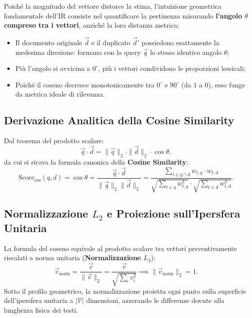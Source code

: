 Poich\'e la magnitudo del vettore distorce la stima, l'intuizione geometrica fondamentale dell'IR consiste nel quantificare la pertinenza misurando \textbf{l'angolo $\theta$ compreso tra i vettori}, anzich\'e la loro distanza metrica:
\begin{itemize}
    \item Il documento originale $\vec{d}$ e il duplicato $\vec{d}'$ possiedono esattamente la medesima direzione: formano con la query $\vec{q}$ lo stesso identico angolo $\theta$;
    \item Pi\`u l'angolo si avvicina a $0^\circ$, pi\`u i vettori condividono le proporzioni lessicali;
    \item Poich\'e il coseno decresce monotonicamente tra $0^\circ$ e $90^\circ$ (da $1$ a $0$), esso funge da metrica ideale di rilevanza.
\end{itemize}

\FloatBarrier
\subsection{Derivazione Analitica della Cosine Similarity}
\label{subsec:derivazione-cosine-similarity}

Dal teorema del prodotto scalare:
\begin{equation}
\vec{q} \cdot \vec{d} = \|\vec{q}\|_2 \cdot \|\vec{d}\|_2 \cdot \cos \theta,
\end{equation}
da cui si ricava la formula canonica della \textbf{Cosine Similarity}:
\begin{equation}
\text{Score}_{\text{cos}}(q, d) = \cos \theta = \frac{\vec{q} \cdot \vec{d}}{\|\vec{q}\|_2 \|\vec{d}\|_2} = \frac{\sum_{t \in q \cap d} w_{t, q} \cdot w_{t, d}}{\sqrt{\sum_{t \in q} w_{t, q}^2} \cdot \sqrt{\sum_{t \in d} w_{t, d}^2}}.
\label{eq:cosine-similarity-def}
\end{equation}

\FloatBarrier
\subsection{Normalizzazione $L_2$ e Proiezione sull'Ipersfera Unitaria}
\label{subsec:normalizzazione-l2-ipersfera}

La formula del coseno equivale al prodotto scalare tra vettori preventivamente riscalati a norma unitaria (\textbf{Normalizzazione $L_2$}):
\begin{equation}
\vec{v}_{\text{norm}} = \frac{\vec{v}}{\|\vec{v}\|_2} = \frac{\vec{v}}{\sqrt{\sum_i v_i^2}} \implies \|\vec{v}_{\text{norm}}\|_2 = 1.
\end{equation}
Sotto il profilo geometrico, la normalizzazione proietta ogni punto sulla superficie dell'ipersfera unitaria a $|\mathcal{V}|$ dimensioni, azzerando le differenze dovute alla lunghezza fisica dei testi.

